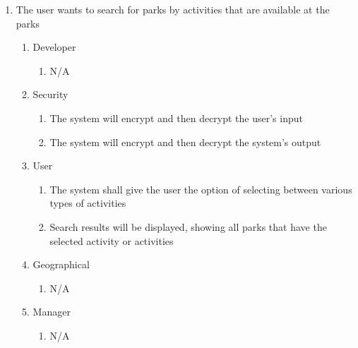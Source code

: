 \documentclass[titlepage]{article}
\begin{document}
\begin{enumerate}[{BE}1.]
    \item The user wants to search for parks by activities that are available at the parks
    \begin{enumerate}[{VP\theenumi}.1]
        \item Developer
            \begin{enumerate}
                \item N/A
            \end{enumerate}
        \item Security
            \begin{enumerate}
                \item The system will encrypt and then decrypt the user's input
                \item The system will encrypt and then decrypt the system's output
            \end{enumerate}
        \item User
            \begin{enumerate}
                \item The system shall give the user the option of selecting between various types
                of activities
                \item Search results will be displayed, showing all parks that have the selected
                activity or activities
            \end{enumerate}
        \item Geographical
            \begin{enumerate}
                \item N/A
            \end{enumerate}
        \item Manager
            \begin{enumerate}
                \item N/A
            \end{enumerate}
    \end{enumerate}


\end{enumerate}
\end{document}
